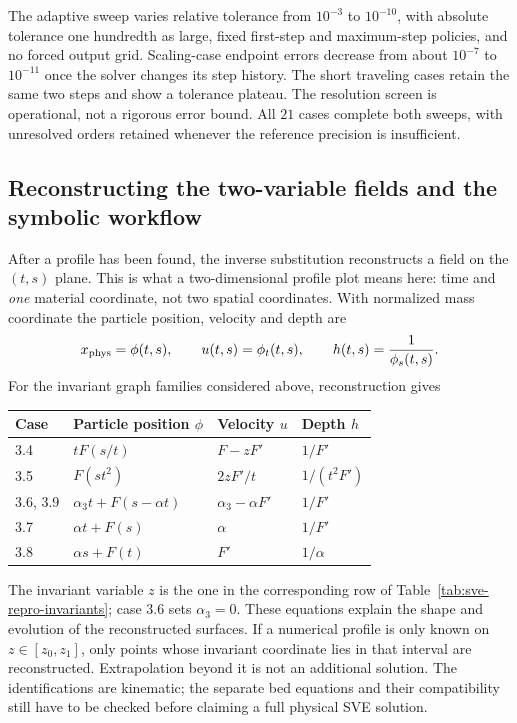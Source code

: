 \documentclass[11pt]{article}
\theoremstyle{definition}
\begin{document}
The adaptive sweep varies relative tolerance from $10^{-3}$ to $10^{-10}$,
with absolute tolerance one hundredth as large, fixed first-step and
maximum-step policies, and no forced output grid. Scaling-case endpoint
errors decrease from about $10^{-7}$ to $10^{-11}$ once the solver changes
its step history. The short traveling cases retain the same two steps and
show a tolerance plateau. The resolution screen is operational, not a
rigorous error bound. All $21$ cases complete both sweeps, with unresolved
orders retained whenever the reference precision is insufficient.


\subsection{Reconstructing the two-variable fields and the symbolic workflow}
After a profile has been found, the inverse substitution reconstructs a
field on the $(t,s)$ plane. This is what a two-dimensional profile plot
means here: time and \emph{one} material coordinate, not two spatial
coordinates. With normalized mass coordinate the particle position,
velocity and depth are
\[
 x_{\rm phys}=\phi(t,s),\qquad u(t,s)=\phi_t(t,s),\qquad
 h(t,s)=\frac1{\phi_s(t,s)}.
\]
For the invariant graph families considered above, reconstruction gives
\begin{center}\small
\begin{tabular}{@{}llll@{}}
\toprule
Case & Particle position $\phi$ & Velocity $u$ & Depth $h$\\
\midrule
3.4 & $tF(s/t)$ & $F-zF'$ & $1/F'$\\
3.5 & $F(st^2)$ & $2zF'/t$ & $1/(t^2F')$\\
3.6, 3.9 & $\alpha_3t+F(s-\alpha t)$ & $\alpha_3-\alpha F'$ & $1/F'$\\
3.7 & $\alpha t+F(s)$ & $\alpha$ & $1/F'$\\
3.8 & $\alpha s+F(t)$ & $F'$ & $1/\alpha$\\
\bottomrule
\end{tabular}
\end{center}
The invariant variable $z$ is the one in the corresponding row of
Table~\ref{tab:sve-repro-invariants}; case 3.6 sets $\alpha_3=0$.
These equations explain the shape and evolution of the reconstructed
surfaces. If a numerical profile is only known on $z\in[z_0,z_1]$,
only points whose invariant coordinate lies in that interval are
reconstructed. Extrapolation beyond it is not an additional solution.
The identifications are kinematic; the separate bed equations and their
compatibility still have to be checked before claiming a full physical SVE
solution.
\end{document}
